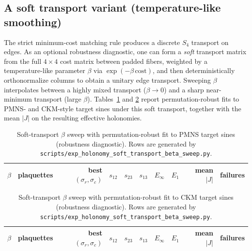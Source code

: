 \subsection{A soft transport variant (temperature-like smoothing)}
\label{subsec:holonomy_soft_transport}

The strict minimum-cost matching rule produces a discrete $S_4$ transport on edges.
As an optional robustness diagnostic, one can form a \emph{soft} transport matrix from the full $4\times 4$ cost matrix between padded fibers, weighted by a temperature-like parameter $\beta$ via $\exp(-\beta\,\mathrm{cost})$, and then deterministically orthonormalize columns to obtain a unitary edge transport.
Sweeping $\beta$ interpolates between a highly mixed transport ($\beta\to 0$) and a sharp near-minimum transport (large $\beta$).
Tables~\ref{tab:holonomy_soft_transport_pmns} and \ref{tab:holonomy_soft_transport_ckm} report permutation-robust fits to PMNS- and CKM-style target sines under this soft transport, together with the mean $|J|$ on the resulting effective holonomies.

\begin{table}[t]
\centering
\scriptsize
\setlength{\tabcolsep}{4pt}
\renewcommand{\arraystretch}{1.15}
\begin{tabular}{rrrrrrrrrr}
\toprule
$\beta$ & plaquettes & best $(\sigma_r,\sigma_c)$ & $s_{12}$ & $s_{23}$ & $s_{13}$ & $E_\infty$ & $E_1$ & mean $|J|$ & failures \\
\midrule
%
\end{tabular}
\caption{Soft-transport $\beta$ sweep with permutation-robust fit to PMNS target sines (robustness diagnostic). Rows are generated by \texttt{scripts/exp\_holonomy\_soft\_transport\_beta\_sweep.py}.}
\label{tab:holonomy_soft_transport_pmns}
\end{table}

\begin{table}[t]
\centering
\scriptsize
\setlength{\tabcolsep}{4pt}
\renewcommand{\arraystretch}{1.15}
\begin{tabular}{rrrrrrrrrr}
\toprule
$\beta$ & plaquettes & best $(\sigma_r,\sigma_c)$ & $s_{12}$ & $s_{23}$ & $s_{13}$ & $E_\infty$ & $E_1$ & mean $|J|$ & failures \\
\midrule
%
\end{tabular}
\caption{Soft-transport $\beta$ sweep with permutation-robust fit to CKM target sines (robustness diagnostic). Rows are generated by \texttt{scripts/exp\_holonomy\_soft\_transport\_beta\_sweep.py}.}
\label{tab:holonomy_soft_transport_ckm}
\end{table}


